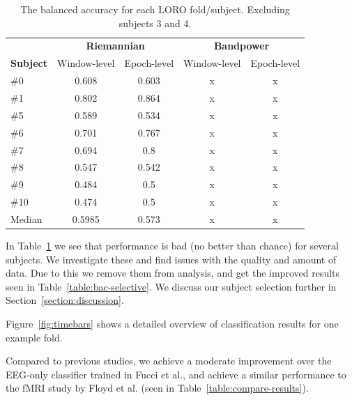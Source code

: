         \begin{table}[h]
            \centering
            \begin{tabular}{lcccc}
                \toprule
                & \multicolumn{2}{c}{\textbf{Riemannian}} & \multicolumn{2}{c}{\textbf{Bandpower}} \\
                \cmidrule(lr){2-3}
                \cmidrule(lr){4-5}
                \textbf{Subject} & Window-level & Epoch-level & Window-level & Epoch-level \\
                \midrule
                \#0  & 0.608  & 0.603 & x & x \\
                \#1  & 0.802  & 0.864 & x & x \\
                \#5  & 0.589  & 0.534 & x & x \\
                \#6  & 0.701  & 0.767 & x & x \\
                \#7  & 0.694  & 0.8   & x & x \\
                \#8  & 0.547  & 0.542 & x & x \\
                \#9  & 0.484  & 0.5   & x & x \\
                \#10 & 0.474  & 0.5   & x & x \\
                \midrule
                Median & 0.5985 & 0.573 & x & x \\
                \bottomrule
            \end{tabular}
            \caption{The balanced accuracy for each LORO fold/subject. Excluding subjects 3 and 4.}\label{table:bac-all}
        \end{table}

        In Table~\ref{table:bac-all} we see that performance is bad (no better than chance) for several subjects. We investigate these and find issues with the quality and amount of data. Due to this we remove them from analysis, and get the improved results seen in Table~\ref{table:bac-selective}. We discuss our subject selection further in Section~\ref{section:discussion}.

        Figure~\ref{fig:timebars} shows a detailed overview of classification results for one example fold.

        Compared to previous studies, we achieve a moderate improvement over the EEG-only classifier trained in Fucci et al., and achieve a similar performance to the fMRI study by Floyd et al. (seen in Table~\ref{table:compare-results}).

